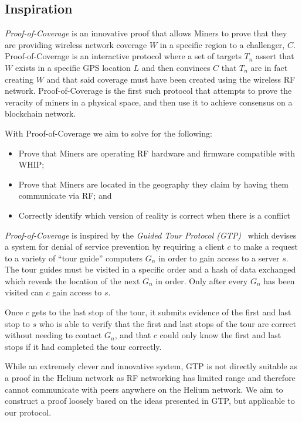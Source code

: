 \documentclass[10pt, nonatbib, nocopyrightspace, reprint]{sigplanconf}
\begin{document}
\subsection{Inspiration}

\emph{Proof-of-Coverage} is an innovative proof that allows Miners to prove that they are providing wireless network coverage $W$ in a specific region to a challenger, $C$. Proof-of-Coverage is an interactive protocol where a set of targets $T_n$ assert that $W$ exists in a specific GPS location $L$ and then convinces $C$ that $T_n$ are in fact creating $W$ and that said coverage must have been created using the wireless RF network. Proof-of-Coverage is the first such protocol that attempts to prove the veracity of miners in a physical space, and then use it to achieve consensus on a blockchain network.

With Proof-of-Coverage we aim to solve for the following:

\begin{itemize}
    \item Prove that Miners are operating RF hardware and firmware compatible with WHIP;
    \item Prove that Miners are located in the geography they claim by having them communicate via RF; and
    \item Correctly identify which version of reality is correct when there is a conflict
\end{itemize}

\emph{Proof-of-Coverage} is inspired by the \emph{Guided Tour Protocol (GTP)}~\cite{gtp} which devises a system for denial of service prevention by requiring a client $c$ to make a request to a variety of ``tour guide'' computers $G_n$ in order to gain access to a server $s$. The tour guides must be visited in a specific order and a hash of data exchanged which reveals the location of the next $G_n$ in order. Only after every $G_n$ has been visited can $c$ gain access to $s$.

Once $c$ gets to the last stop of the tour, it submits evidence of the first and last stop to $s$ who is able to verify that the first and last stops of the tour are correct without needing to contact $G_n$, and that $c$ could only know the first and last stops if it had completed the tour correctly.

While an extremely clever and innovative system, GTP is not directly suitable as a proof in the Helium network as RF networking has limited range and therefore cannot communicate with peers anywhere on the Helium network. We aim to construct a proof loosely based on the ideas presented in GTP, but applicable to our protocol.
\end{document}
